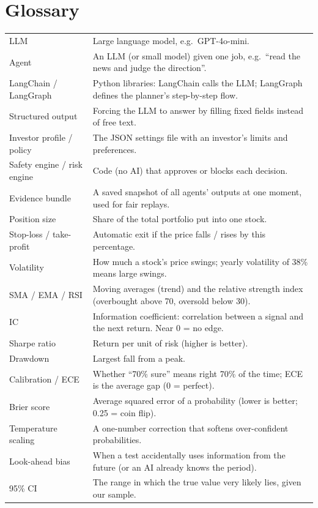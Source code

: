 \documentclass[10.5pt,a4paper]{article}
\begin{document}
\section*{Glossary}
\begin{tabularx}{\linewidth}{L{3.2cm}Y}
\toprule
LLM & Large language model, e.g.\ GPT-4o-mini. \\
Agent & An LLM (or small model) given one job, e.g.\ ``read the news and judge the direction''. \\
LangChain / LangGraph & Python libraries: LangChain calls the LLM; LangGraph defines the planner's step-by-step flow. \\
Structured output & Forcing the LLM to answer by filling fixed fields instead of free text. \\
Investor profile / policy & The JSON settings file with an investor's limits and preferences. \\
Safety engine / risk engine & Code (no AI) that approves or blocks each decision. \\
Evidence bundle & A saved snapshot of all agents' outputs at one moment, used for fair replays. \\
Position size & Share of the total portfolio put into one stock. \\
Stop-loss / take-profit & Automatic exit if the price falls / rises by this percentage. \\
Volatility & How much a stock's price swings; yearly volatility of 38\% means large swings. \\
SMA / EMA / RSI & Moving averages (trend) and the relative strength index (overbought above 70, oversold below 30). \\
IC & Information coefficient: correlation between a signal and the next return. Near 0 = no edge. \\
Sharpe ratio & Return per unit of risk (higher is better). \\
Drawdown & Largest fall from a peak. \\
Calibration / ECE & Whether ``70\% sure'' means right 70\% of the time; ECE is the average gap (0 = perfect). \\
Brier score & Average squared error of a probability (lower is better; 0.25 = coin flip). \\
Temperature scaling & A one-number correction that softens over-confident probabilities. \\
Look-ahead bias & When a test accidentally uses information from the future (or an AI already knows the period). \\
95\% CI & The range in which the true value very likely lies, given our sample. \\
\bottomrule
\end{tabularx}
\end{document}
